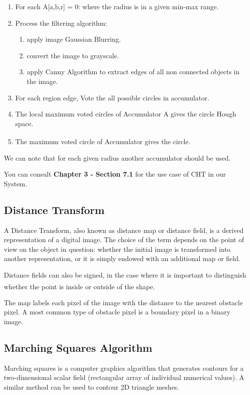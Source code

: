 \begin{enumerate}
    \item For each A[a,b,r] = 0: where the radius is in a given min-max range.
    \item Process the filtering algorithm: 
    \begin{enumerate}
        \item apply image Gaussian Blurring.
        \item convert the image to grayscale.
        \item apply Canny Algorithm to extract edges of all non connected objects in the image.
    \end{enumerate}
    \item For each region edge, Vote the all possible circles in accumulator.
    \item The local maximum voted circles of Accumulator A gives the circle Hough space.
    \item The maximum voted circle of Accumulator gives the circle. \textsuperscript{\cite{circle-hough-transform}}
\end{enumerate}

We can note that for each given radius another accumulator should be used.

You can consult \textbf{Chapter 3 - Section 7.1} for the use case of CHT in our System.

\subsection{Distance Transform}
\hspace{\parindent}
A Distance Transform, also known as distance map or distance field, is a derived representation of a digital image. The choice of the term depends on the point of view on the object in question: whether the initial image is transformed into another representation, or it is simply endowed with an additional map or field.

Distance fields can also be signed, in the case where it is important to distinguish whether the point is inside or outside of the shape. \textsuperscript{\cite{frisken2000adaptively}}

The map labels each pixel of the image with the distance to the nearest obstacle pixel. A most common type of obstacle pixel is a boundary pixel in a binary image.

\subsection{Marching Squares Algorithm}
\hspace{\parindent}
Marching squares is a computer graphics algorithm that generates contours for a two-dimensional scalar field (rectangular array of individual numerical values). A similar method can be used to contour 2D triangle meshes.

